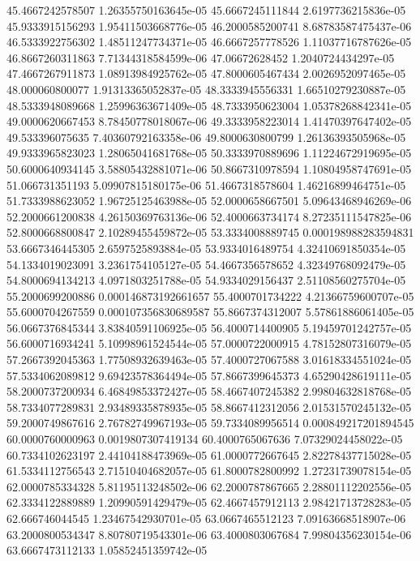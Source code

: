 {45.4667242578507 1.26355750163645e-05
45.6667245111844 2.6197736215836e-05
45.9333915156293 1.95411503668776e-05
46.2000585200741 8.68783587475437e-06
46.5333922756302 1.48511247734371e-05
46.6667257778526 1.11037716787626e-05
46.8667260311863 7.71344318584599e-06
47.06672628452 1.2040724434297e-05
47.4667267911873 1.08913984925762e-05
47.8000605467434 2.0026952097465e-05
48.000060800077 1.91313365052837e-05
48.3333945556331 1.66510279230887e-05
48.5333948089668 1.25996363671409e-05
48.7333950623004 1.05378268842341e-05
49.0000620667453 8.78450778018067e-06
49.3333958223014 1.41470397647402e-05
49.533396075635 7.40360792163358e-06
49.8000630800799 1.26136393505968e-05
49.9333965823023 1.28065041681768e-05
50.3333970889696 1.11224672919695e-05
50.6000640934145 3.58805432881071e-06
50.8667310978594 1.10804958747691e-05
51.066731351193 5.09907815180175e-06
51.4667318578604 1.46216899464751e-05
51.7333988623052 1.96725125463988e-05
52.0000658667501 5.09643468946269e-06
52.2000661200838 4.26150369763136e-06
52.4000663734174 8.27235111547825e-06
52.8000668800847 2.10289455459872e-05
53.3334008889745 0.000198988283594831
53.6667346445305 2.6597525893884e-05
53.9334016489754 4.32410691850354e-05
54.1334019023091 3.2361754105127e-05
54.4667356578652 4.32349768092479e-05
54.8000694134213 4.0971803251788e-05
54.9334029156437 2.51108560275704e-05
55.2000699200886 0.000146873192661657
55.4000701734222 4.21366759600707e-05
55.6000704267559 0.000107356830689587
55.8667374312007 5.57861886061405e-05
56.0667376845344 3.83840591106925e-05
56.4000714400905 5.19459701242757e-05
56.6000716934241 5.10998961524544e-05
57.0000722000915 4.78152807316079e-05
57.2667392045363 1.77508932639463e-05
57.4000727067588 3.01618334551024e-05
57.5334062089812 9.69423578364494e-05
57.8667399645373 4.65290428619111e-05
58.2000737200934 6.46849853372427e-05
58.4667407245382 2.99804632818768e-05
58.7334077289831 2.93489335878935e-05
58.8667412312056 2.01531570245132e-05
59.2000749867616 2.76782749967193e-05
59.7334089956514 0.000849217201894545
60.0000760000963 0.0019807307419134
60.4000765067636 7.07329024458022e-05
60.7334102623197 2.44104188473969e-05
61.0000772667645 2.82278437715028e-05
61.5334112756543 2.71510404682057e-05
61.8000782800992 1.27231739078154e-05
62.0000785334328 5.81195113248502e-06
62.2000787867665 2.28801112202556e-05
62.3334122889889 1.20990591429479e-05
62.4667457912113 2.98421713728283e-05
62.666746044545 1.23467542930701e-05
63.0667465512123 7.09163668518907e-06
63.2000800534347 8.80780719543301e-06
63.4000803067684 7.99804356230154e-06
63.6667473112133 1.05852451359742e-05
}
